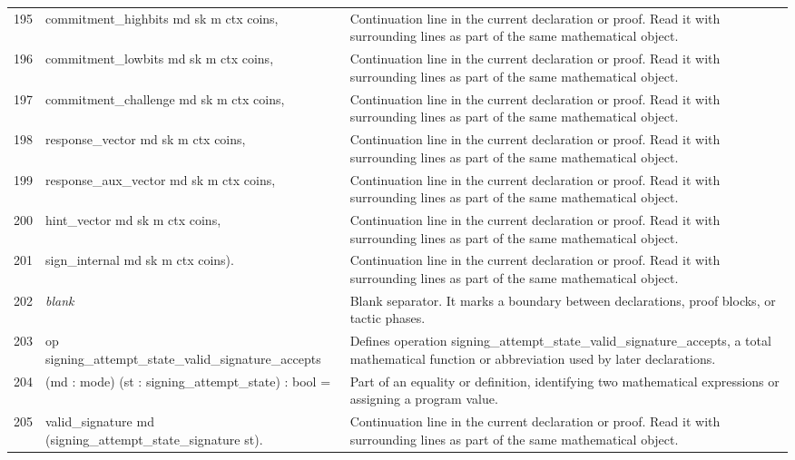 \documentclass[10pt]{article}
\begin{document}
\begin{longtable}{r L{0.53\textwidth} L{0.37\textwidth}}
195 & {\ttfamily\scriptsize     commitment\_highbits md sk m ctx coins,} & Continuation line in the current declaration or proof.  Read it with surrounding lines as part of the same mathematical object. \\
196 & {\ttfamily\scriptsize     commitment\_lowbits md sk m ctx coins,} & Continuation line in the current declaration or proof.  Read it with surrounding lines as part of the same mathematical object. \\
197 & {\ttfamily\scriptsize     commitment\_challenge md sk m ctx coins,} & Continuation line in the current declaration or proof.  Read it with surrounding lines as part of the same mathematical object. \\
198 & {\ttfamily\scriptsize     response\_vector md sk m ctx coins,} & Continuation line in the current declaration or proof.  Read it with surrounding lines as part of the same mathematical object. \\
199 & {\ttfamily\scriptsize     response\_aux\_vector md sk m ctx coins,} & Continuation line in the current declaration or proof.  Read it with surrounding lines as part of the same mathematical object. \\
200 & {\ttfamily\scriptsize     hint\_vector md sk m ctx coins,} & Continuation line in the current declaration or proof.  Read it with surrounding lines as part of the same mathematical object. \\
201 & {\ttfamily\scriptsize     sign\_internal md sk m ctx coins).} & Continuation line in the current declaration or proof.  Read it with surrounding lines as part of the same mathematical object. \\
202 & {\ttfamily\scriptsize \emph{blank}} & Blank separator.  It marks a boundary between declarations, proof blocks, or tactic phases. \\
203 & {\ttfamily\scriptsize op signing\_attempt\_state\_valid\_signature\_accepts} & Defines operation signing\_attempt\_state\_valid\_signature\_accepts, a total mathematical function or abbreviation used by later declarations. \\
204 & {\ttfamily\scriptsize    (md : mode) (st : signing\_attempt\_state) : bool =} & Part of an equality or definition, identifying two mathematical expressions or assigning a program value. \\
205 & {\ttfamily\scriptsize   valid\_signature md (signing\_attempt\_state\_signature st).} & Continuation line in the current declaration or proof.  Read it with surrounding lines as part of the same mathematical object. \\

\end{longtable}
\end{document}
